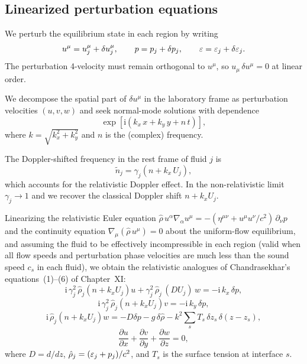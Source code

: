 \subsection{Linearized perturbation equations}

We perturb the equilibrium state in each region by writing
\begin{equation}\label{eq:rel-11-8}
  u^{\mu} = u_j^{\mu} + \delta u_j^{\mu}, \qquad
  p = p_j + \delta p_j, \qquad
  \varepsilon = \varepsilon_j + \delta\varepsilon_j.
\end{equation}
The perturbation 4-velocity must remain orthogonal to $u^{\mu}$, so
$u_{\mu}\,\delta u^{\mu} = 0$ at linear order.

We decompose the spatial part of $\delta u^{\mu}$ in the laboratory
frame as perturbation velocities $(u, v, w)$ and seek normal-mode
solutions with dependence
\begin{equation}\label{eq:rel-11-9}
  \exp\!\left[\mathrm{i}(k_x\,x + k_y\,y + n\,t)\right],
\end{equation}
where $k = \sqrt{k_x^{2}+k_y^{2}}$ and $n$ is the (complex) frequency.

The Doppler-shifted frequency in the rest frame of fluid $j$ is
\begin{equation}\label{eq:rel-11-10}
  \tilde{n}_j = \gamma_j\!\left(n + k_x\, U_j\right),
\end{equation}
which accounts for the relativistic Doppler effect. In the
non-relativistic limit $\gamma_j \to 1$ and we recover the classical
Doppler shift $n + k_x U_j$.

Linearizing the relativistic Euler equation
$\hat{\rho}\, u^{\alpha}\nabla_{\alpha} u^{\mu}
= -(\eta^{\mu\nu} + u^{\mu}u^{\nu}/c^{2})\,\partial_{\nu} p$
and the continuity equation $\nabla_{\mu}(\hat{\rho}\, u^{\mu}) = 0$
about the uniform-flow equilibrium, and assuming the fluid to be
effectively incompressible in each region (valid when all flow speeds
and perturbation phase velocities are much less than the sound speed
$c_s$ in each fluid), we obtain the relativistic analogues of
Chandrasekhar's equations~(1)--(6) of Chapter~XI:
\begin{equation}\label{eq:rel-11-11}
  \mathrm{i}\,\gamma_j^{2}\,\hat{\rho}_j\!\left(n + k_x U_j\right) u
  + \gamma_j^{2}\,\hat{\rho}_j\,(DU_j)\, w
  = -\mathrm{i}\, k_x\,\delta p,
\end{equation}
\begin{equation}\label{eq:rel-11-12}
  \mathrm{i}\,\gamma_j^{2}\,\hat{\rho}_j\!\left(n + k_x U_j\right) v
  = -\mathrm{i}\, k_y\,\delta p,
\end{equation}
\begin{equation}\label{eq:rel-11-13}
  \mathrm{i}\,\hat{\rho}_j\!\left(n + k_x U_j\right) w
  = -D\delta p - g\,\delta\hat{\rho}
  - k^{2}\sum_s T_s\,\delta z_s\,\delta(z - z_s),
\end{equation}
\begin{equation}\label{eq:rel-11-14}
  \frac{\partial u}{\partial x}
  + \frac{\partial v}{\partial y}
  + \frac{\partial w}{\partial z} = 0,
\end{equation}
where $D = d/dz$, $\hat{\rho}_j = (\varepsilon_j + p_j)/c^{2}$, and
$T_s$ is the surface tension at interface $s$.

